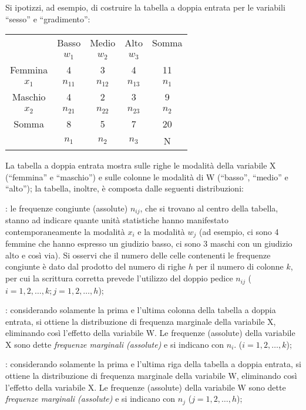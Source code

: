 Si ipotizzi, ad esempio, di costruire la tabella a doppia entrata per le 
variabili ``sesso'' e ``gradimento'':

\begin{center}
\begin{tabular}{|c|c|c|c|c|}
\hline
 & Basso & Medio & Alto & Somma\\
 & \(w_1\) & \(w_2\) &  \(w_3\) & \\
 \hline
 Femmina & 4 & 3 & 4 & 11\\
 \(x_1\) & \(n_{11}\) & \(n_{12}\) &  \(n_{13}\) & \(n_1\) \\
  \hline
   Maschio & 4 & 2 & 3 & 9\\
   \(x_2\) & \(n_{21}\) & \(n_{22}\) &  \(n_{23}\) & \(n_2\) \\
   \hline
 Somma  & 8 & 5& 7&20\\
    & \(n_{1}\) & \(n_{2}\) &  \(n_{3}\) & N \\  
  \hline
\end{tabular}
\end{center}

\vspace{6pt}
La tabella a doppia entrata mostra sulle righe le modalità della 
variabile X (``femmina'' e ``maschio'') e sulle colonne le modalità di 
W (``basso'', ``medio'' e ``alto''); la tabella, inoltre, è composta dalle 
seguenti distribuzioni:  

\begin{description} [noitemsep]
        \item [distribuzione congiunta di X e di W]: 
le frequenze congiunte (assolute) \(n_{ij}\), 
che si trovano al centro della tabella, 
stanno ad indicare quante unità statistiche hanno manifestato 
contemporaneamente la modalità \(x_i\) e la modalità \(w_j\) (ad esempio, ci 
sono 4 femmine che hanno espresso un giudizio basso, ci sono 3 maschi con 
un giudizio alto e così via). Si osservi che il numero delle celle 
contenenti le frequenze congiunte è dato dal prodotto del numero di righe 
\(h\) per il numero di colonne \(k\), per cui la scrittura corretta prevede 
l'utilizzo del doppio pedice \(n_{ij}\) (\(i=1,2,\dots,k; j=1,2,\dots,h\));
        \item [distribuzione marginale di X]: 
considerando solamente 
la prima e l'ultima colonna della tabella a doppia entrata, si ottiene la 
distribuzione di frequenza marginale della variabile X, eliminando così 
l'effetto della variabile W. Le frequenze (assolute) della variabile X sono 
dette \emph{frequenze marginali (assolute)} e si indicano con \(n_i\). 
(\(i=1,2,\dots,k\));
        \item [distribuzione marginale di W]: 
considerando solamente 
la prima e l'ultima riga della tabella a doppia entrata, si ottiene la 
distribuzione di frequenza marginale della variabile W, eliminando così 
l'effetto della variabile X. Le frequenze (assolute) della variabile W sono 
dette \emph{frequenze marginali (assolute)} e si indicano con \(n_j\) 
(\(j=1,2,\dots,h\));
\end{description}


